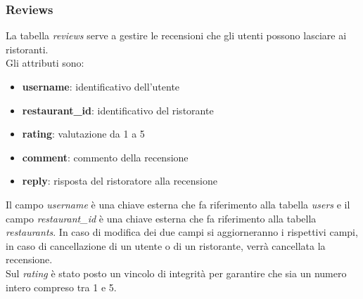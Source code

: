 \subsubsection{Reviews}
La tabella \textit{reviews} serve a gestire le recensioni
che gli utenti possono lasciare ai ristoranti.\\
Gli attributi sono:
\begin{itemize}
    \item \textbf{username}: identificativo dell'utente
    \item \textbf{restaurant\_id}: identificativo del ristorante
    \item \textbf{rating}: valutazione da 1 a 5
    \item \textbf{comment}: commento della recensione
    \item \textbf{reply}: risposta del ristoratore alla recensione
\end{itemize}
Il campo \textit{username} è una chiave esterna che fa riferimento
alla tabella \textit{users} e il campo \textit{restaurant\_id} 
è una chiave esterna che fa riferimento
alla tabella \textit{restaurants}. In caso di modifica dei due campi
si aggiorneranno i rispettivi campi, in caso di cancellazione
di un utente o di un ristorante, verrà cancellata la recensione.\\
Sul \textit{rating} è stato posto un vincolo di integrità
per garantire che sia un numero intero compreso tra 1 e 5.
